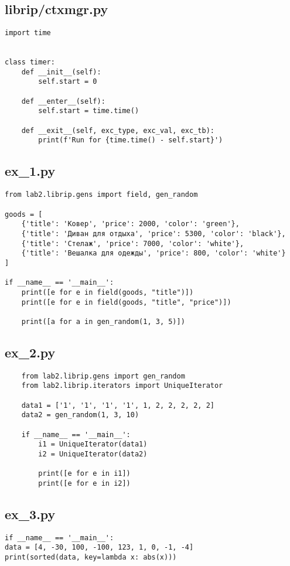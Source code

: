 \documentclass{article}
\begin{document}
\subsection{librip/ctxmgr.py}
\begin{verbatim}
import time


class timer:
    def __init__(self):
        self.start = 0

    def __enter__(self):
        self.start = time.time()

    def __exit__(self, exc_type, exc_val, exc_tb):
        print(f'Run for {time.time() - self.start}')
\end{verbatim}

\subsection{ex\_1.py}
\begin{verbatim}
from lab2.librip.gens import field, gen_random

goods = [
    {'title': 'Ковер', 'price': 2000, 'color': 'green'},
    {'title': 'Диван для отдыха', 'price': 5300, 'color': 'black'},
    {'title': 'Стелаж', 'price': 7000, 'color': 'white'},
    {'title': 'Вешалка для одежды', 'price': 800, 'color': 'white'}
]

if __name__ == '__main__':
    print([e for e in field(goods, "title")])
    print([e for e in field(goods, "title", "price")])

    print([a for a in gen_random(1, 3, 5)])

\end{verbatim}
\subsection{ex\_2.py}
\begin{verbatim}
    from lab2.librip.gens import gen_random
    from lab2.librip.iterators import UniqueIterator
    
    data1 = ['1', '1', '1', '1', 1, 2, 2, 2, 2, 2]
    data2 = gen_random(1, 3, 10)
    
    if __name__ == '__main__':
        i1 = UniqueIterator(data1)
        i2 = UniqueIterator(data2)
    
        print([e for e in i1])
        print([e for e in i2])
\end{verbatim}
\subsection{ex\_3.py}
\begin{verbatim}
if __name__ == '__main__':
data = [4, -30, 100, -100, 123, 1, 0, -1, -4]
print(sorted(data, key=lambda x: abs(x)))
\end{verbatim}
\end{document}
